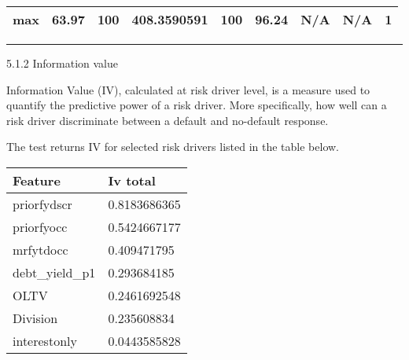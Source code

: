 \begin{longtable}[]{@{}lllllllll@{}}
\begin{minipage}[t]{0.05\columnwidth}\raggedright
max\strut
\end{minipage} & \begin{minipage}[t]{0.08\columnwidth}\raggedright
63.97\strut
\end{minipage} & \begin{minipage}[t]{0.09\columnwidth}\raggedright
100\strut
\end{minipage} & \begin{minipage}[t]{0.09\columnwidth}\raggedright
408.3590591\strut
\end{minipage} & \begin{minipage}[t]{0.08\columnwidth}\raggedright
100\strut
\end{minipage} & \begin{minipage}[t]{0.09\columnwidth}\raggedright
96.24\strut
\end{minipage} & \begin{minipage}[t]{0.09\columnwidth}\raggedright
N/A\strut
\end{minipage} & \begin{minipage}[t]{0.08\columnwidth}\raggedright
N/A\strut
\end{minipage} & \begin{minipage}[t]{0.11\columnwidth}\raggedright
1\strut
\end{minipage}\tabularnewline
\bottomrule
\end{longtable}

\begin{center}\rule{0.5\linewidth}{\linethickness}\end{center}

5.1.2 Information value

Information Value (IV), calculated at risk driver level, is a measure
used to quantify the predictive power of a risk driver. More
specifically, how well can a risk driver discriminate between a default
and no-default response.

The test returns IV for selected risk drivers listed in the table below.

\begin{longtable}[]{@{}ll@{}}
\toprule
Feature & Iv total\tabularnewline
\midrule
\endhead
priorfydscr & 0.8183686365\tabularnewline
priorfyocc & 0.5424667177\tabularnewline
mrfytdocc & 0.409471795\tabularnewline
debt\_yield\_p1 & 0.293684185\tabularnewline
OLTV & 0.2461692548\tabularnewline
Division & 0.235608834\tabularnewline
interestonly & 0.0443585828\tabularnewline
\bottomrule
\end{longtable}

